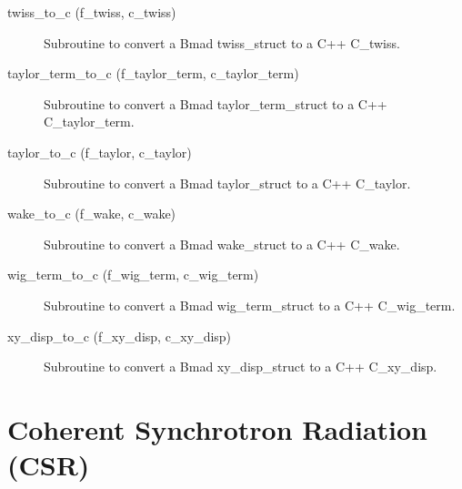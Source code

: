 \begin{description}
\label{r:twiss.to.c}
\item[twiss_to_c (f_twiss, c_twiss)] \Newline 
Subroutine to convert a Bmad twiss_struct to a C++ C_twiss.

\label{r:taylor.term.to.c}
\item[taylor_term_to_c (f_taylor_term, c_taylor_term)] \Newline 
Subroutine to convert a Bmad taylor_term_struct to a C++ C_taylor_term.

\label{r:taylor.to.c}
\item[taylor_to_c (f_taylor, c_taylor)] \Newline 
Subroutine to convert a Bmad taylor_struct to a C++ C_taylor.

\label{r:wake.to.c}
\item[wake_to_c (f_wake, c_wake)] \Newline 
Subroutine to convert a Bmad wake_struct to a C++ C_wake.

\label{r:wig.term.to.c}
\item[wig_term_to_c (f_wig_term, c_wig_term)] \Newline 
Subroutine to convert a Bmad wig_term_struct to a C++ C_wig_term.

\label{r:xy.disp.to.c}
\item[xy_disp_to_c (f_xy_disp, c_xy_disp)] \Newline
Subroutine to convert a Bmad xy_disp_struct to a C++ C_xy_disp.

\end{description}

\section{Coherent Synchrotron Radiation (CSR)}
\label{r:csr}

